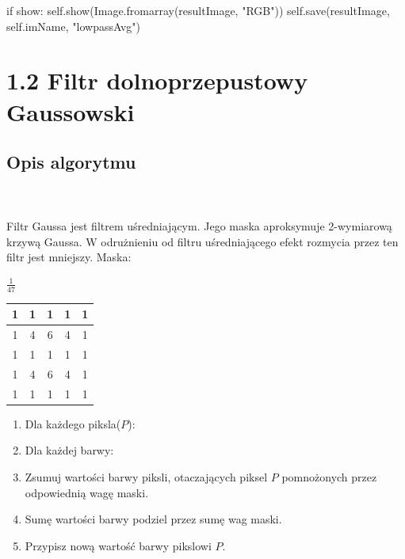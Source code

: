 \documentclass[final,a4paper,openany,12pt]{mwbk}
\begin{document}
if show: \newline
\indent self.show(Image.fromarray(resultImage, "RGB")) \newline
\indent self.save(resultImage, self.imName, "lowpassAvg") \newline

\newpage

\section*{1.2 Filtr dolnoprzepustowy Gaussowski}
\subsection*{Opis algorytmu}
\hfill
\\\\
\indent Filtr Gaussa jest filtrem uśredniającym. Jego maska aproksymuje 2-wymiarową krzywą Gaussa. W odrużnieniu od filtru uśredniającego efekt rozmycia przez ten filtr jest mniejszy. Maska:
\begin{center}
	$\frac{1}{47}$ 
	\begin{tabular}{|c|c|c|c|c|}
		\hline
		1 & 1 & 1 & 1 & 1\\
		\hline
		1 & 4 & 6 & 4 & 1\\
		\hline
		1 & 1 & 1 & 1 & 1\\
		\hline
		1 & 4 & 6 & 4 & 1\\
		\hline
		1 & 1 & 1 & 1 & 1\\
		\hline
	\end{tabular}
\end{center}

\begin{enumerate}
	\item Dla każdego piksla($P$):
	\item Dla każdej barwy:
	\item Zsumuj wartości barwy piksli, otaczających piksel $P$ pomnożonych przez odpowiednią wagę maski.
	\item Sumę wartości barwy podziel przez sumę wag maski.
	\item Przypisz nową wartość barwy pikslowi $P$.
\end{enumerate}
\end{document}
